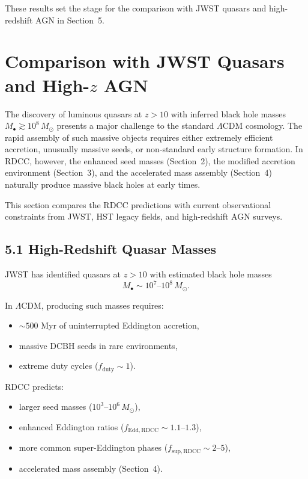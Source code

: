 \documentclass[11pt,a4paper]{article}
\begin{document}
These results set the stage for the comparison with JWST quasars and high-redshift AGN in 
Section~5.

\section{Comparison with JWST Quasars and High-\texorpdfstring{$z$}{z} AGN}

The discovery of luminous quasars at $z > 10$ with inferred black hole masses 
$M_{\bullet} \gtrsim 10^{8}\,M_{\odot}$ presents a major challenge to the standard 
$\Lambda$CDM cosmology. The rapid assembly of such massive objects requires either 
extremely efficient accretion, unusually massive seeds, or non-standard early structure 
formation. In RDCC, however, the enhanced seed masses (Section~2), the modified accretion 
environment (Section~3), and the accelerated mass assembly (Section~4) naturally produce 
massive black holes at early times.

This section compares the RDCC predictions with current observational constraints from JWST, 
HST legacy fields, and high-redshift AGN surveys.

\subsection*{5.1 High-Redshift Quasar Masses}

JWST has identified quasars at $z > 10$ with estimated black hole masses
\begin{equation}
    M_{\bullet} \sim 10^{7}\text{--}10^{8}\,M_{\odot}.
\end{equation}

In $\Lambda$CDM, producing such masses requires:

\begin{itemize}
    \item $\sim 500$ Myr of uninterrupted Eddington accretion,
    \item massive DCBH seeds in rare environments,
    \item extreme duty cycles ($f_{\mathrm{duty}} \sim 1$).
\end{itemize}

RDCC predicts:

\begin{itemize}
    \item larger seed masses ($10^{3}$–$10^{6}\,M_{\odot}$),
    \item enhanced Eddington ratios ($f_{\mathrm{Edd,RDCC}} \sim 1.1$–$1.3$),
    \item more common super-Eddington phases ($f_{\mathrm{sup,RDCC}} \sim 2$–$5$),
    \item accelerated mass assembly (Section~4).
\end{itemize}
\end{document}
